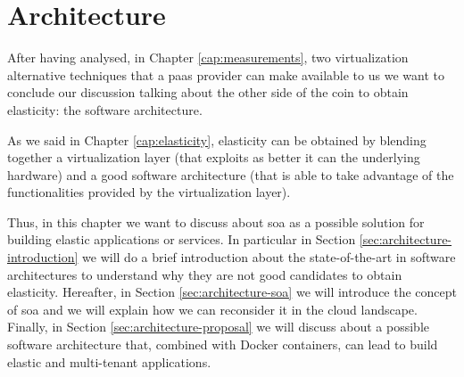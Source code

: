 %
%
\chapter{Architecture}
\label{cap:architecture}
After having analysed, in Chapter \ref{cap:measurements}, two virtualization alternative techniques that
a \ac{paas} provider can make available to us we want to conclude our discussion talking about the other
side of the coin to obtain elasticity: the software architecture.

As we said in Chapter \ref{cap:elasticity}, elasticity can be obtained by blending together a virtualization
layer (that exploits as better it can the underlying hardware) and a good software architecture (that is able
to take advantage of the functionalities provided by the virtualization layer).

Thus, in this chapter we want to discuss about \acf{soa} as a possible solution for building elastic
applications or services. In particular in Section \ref{sec:architecture-introduction} we will do
a brief introduction about the state-of-the-art in software architectures to understand why they are not
good candidates to obtain elasticity. Hereafter, in Section \ref{sec:architecture-soa} we will introduce
the concept of \ac{soa} and we will explain how we can reconsider it in the cloud landscape. Finally, in
Section \ref{sec:architecture-proposal} we will discuss about a possible software architecture that,
combined with Docker containers, can lead to build elastic and multi-tenant applications.





